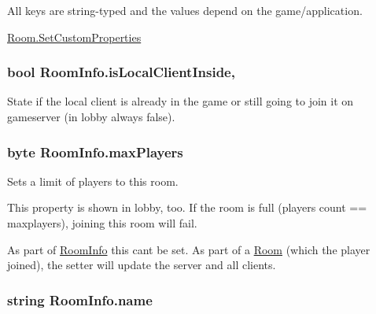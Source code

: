 All keys are string-\/typed and the values depend on the game/application.

\hyperlink{class_room_a9f8ac164f4f24be4140221b72792250a}{Room.\+Set\+Custom\+Properties} 
\subsubsection[{\texorpdfstring{is\+Local\+Client\+Inside}{isLocalClientInside}}]{\setlength{\rightskip}{0pt plus 5cm}bool Room\+Info.\+is\+Local\+Client\+Inside\hspace{0.3cm}{\ttfamily [get]}, {\ttfamily [set]}}\hypertarget{class_room_info_a1e862ae572d36aba8d35f57241450082}{}\label{class_room_info_a1e862ae572d36aba8d35f57241450082}


State if the local client is already in the game or still going to join it on gameserver (in lobby always false). 

\subsubsection[{\texorpdfstring{max\+Players}{maxPlayers}}]{\setlength{\rightskip}{0pt plus 5cm}byte Room\+Info.\+max\+Players\hspace{0.3cm}{\ttfamily [get]}}\hypertarget{class_room_info_a25abb4134a29834298f1c5abcfb85456}{}\label{class_room_info_a25abb4134a29834298f1c5abcfb85456}


Sets a limit of players to this room. 

This property is shown in lobby, too. If the room is full (players count == maxplayers), joining this room will fail. 

As part of \hyperlink{class_room_info}{Room\+Info} this can\textquotesingle{}t be set. As part of a \hyperlink{class_room}{Room} (which the player joined), the setter will update the server and all clients. 
\subsubsection[{\texorpdfstring{name}{name}}]{\setlength{\rightskip}{0pt plus 5cm}string Room\+Info.\+name\hspace{0.3cm}{\ttfamily [get]}}\hypertarget{class_room_info_a77189ececa62ba47ff70359fd2db9af5}{}\label{class_room_info_a77189ececa62ba47ff70359fd2db9af5}


